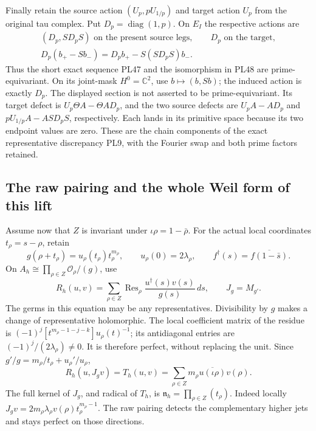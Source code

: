 \documentclass[11pt,a4paper]{article}
\theoremstyle{definition}\newtheorem{definition}[theorem]{Definition}
\newcommand{\C}{\mathbb C}\newcommand{\R}{\mathbb R}
\providecommand{\Res}{\operatorname{Res}}
\begin{document}
Finally retain the source action
\((U_p,pU_{1/p})\) and target action \(U_p\) from the original
tau complex. Put \(D_p=\operatorname{diag}(1,p)\).
On \(E_I\) the respective actions are
\[
 \begin{gathered}
 (D_p,SD_pS)\text{ on the present source legs},\qquad
 D_p\text{ on the target},\\
 D_p(b_+-Sb_-)=D_pb_+-S(SD_pS)b_-.
 \end{gathered}
 \tag{PL49}
\]
Thus the short exact sequence PL47 and the isomorphism in PL48
are prime-equivariant. On its joint-mask \(H^0=\C^2\), use
\(b\mapsto(b,Sb)\); the induced action is exactly \(D_p\).
The displayed section is not asserted to be prime-equivariant.
Its target defect is \(U_p\Theta A-\Theta A D_p\), and the two
source defects are \(U_pA-AD_p\) and
\(pU_{1/p}A-ASD_pS\), respectively. Each lands in its primitive
space because its two endpoint values are zero. These are the
chain components of the exact representative discrepancy PL9,
with the Fourier swap and both prime factors retained.

\subsection{The raw pairing and the whole Weil form of this lift}
Assume now that \(Z\) is invariant under
\(\iota\rho=1-\bar\rho\). For the actual local coordinates
\(t_\rho=s-\rho\), retain
\[
 g(\rho+t_\rho)=u_\rho(t_\rho)t_\rho^{m_\rho},
 \qquad u_\rho(0)=2\lambda_\rho,\qquad
 f^\dagger(s)=\overline{f(1-\bar s)}.
 \tag{PL23}
\]
On \(A_h\cong\prod_{\rho\in Z}\mathcal O_\rho/(g)\), use
\[
 R_h(u,v)=\sum_{\rho\in Z}\Res_\rho
       \frac{u^\dagger(s)v(s)}{g(s)}\,ds,\qquad J_g=M_{g'}.
 \tag{PL24}\label{pl:pl:raw}
\]
The germs in this equation may be any representatives.
Divisibility by \(g\) makes a change of representative holomorphic.
The local coefficient matrix of the residue is
\((-1)^j[t^{m_\rho-1-j-k}]u_\rho(t)^{-1}\);
its antidiagonal entries are \((-1)^j/(2\lambda_\rho)\ne0\).
It is therefore perfect, without replacing the unit.
Since \(g'/g=m_\rho/t_\rho+u_\rho'/u_\rho\),
\[
 R_h(u,J_gv)=T_h(u,v)
 =\sum_{\rho\in Z}m_\rho\overline{u(\iota\rho)}v(\rho).
 \tag{PL25}\label{pl:pl:Jacobian}
\]
The full kernel of \(J_g\), and radical of \(T_h\), is
\(\mathfrak n_h=\prod_{\rho\in Z}(t_\rho)\). Indeed locally
\(J_gv=2m_\rho\lambda_\rho v(\rho)t_\rho^{m_\rho-1}\).
The raw pairing detects the complementary higher jets and stays
perfect on those directions.
\end{document}
